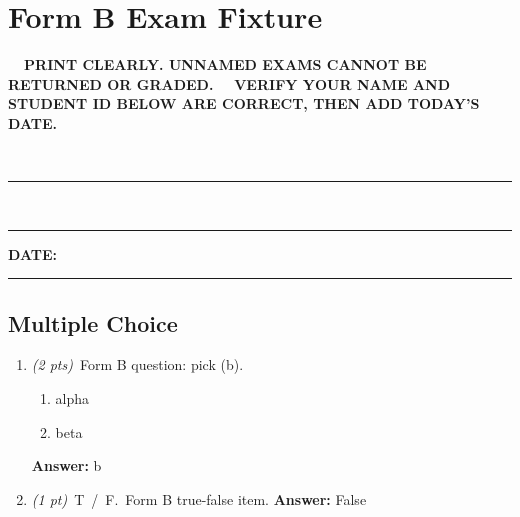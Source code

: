 \documentclass[11pt]{article}
\makeatletter
\newcommand{\fieldline}[2]{%
  \rlap{\hspace{0.5em}\raisebox{2.2pt}{#2}}\rule[-3pt]{#1}{0.8pt}%
}
\newcommand{\identityinstruction}{%
  \ifx\studentname\@empty
    {\sffamily\bfseries\small\ding{43}~~PRINT CLEARLY. UNNAMED EXAMS CANNOT BE RETURNED OR GRADED.}%
  \else
    {\sffamily\bfseries\small\ding{43}~~VERIFY YOUR NAME AND STUDENT ID BELOW ARE CORRECT, THEN ADD TODAY'S DATE.}%
  \fi%
}
\newif\ifanswers\answersfalse
\newif\ifanswers\answerstrue
\newcommand{\examsection}[1]{\subsection*{#1}}
\newcommand{\correctchoice}[1]{#1}
\newcommand{\wrongchoice}[1]{#1}
\makeatother
\begin{document}
\section*{Form B Exam Fixture}
\noindent\identityinstruction\par\vspace{12pt}
~\fieldline{13.5cm}{\large\studentname}\par\vspace{14pt}
~\fieldline{5.5cm}{\large\ttfamily\studentid}\hfill{\sffamily\bfseries\large DATE:}~\rule[-3pt]{4cm}{0.8pt}\par\vspace{6pt}
\examsection{Multiple Choice}
\begin{enumerate}
\item \textit{(2 pts)}~Form B question: pick (b).
  \begin{enumerate}[label=(\alph*)]
    \item \wrongchoice{alpha}
    \item \correctchoice{beta}
  \end{enumerate}
  \ifanswers \textcolor{keyred}{\textbf{Answer:} b} \fi
\item \textit{(1 pt)}~\textsc{T~/~F.}~Form B true-false item.
  \ifanswers \textcolor{keyred}{\textbf{Answer:} False} \fi
\end{enumerate}
\end{document}
